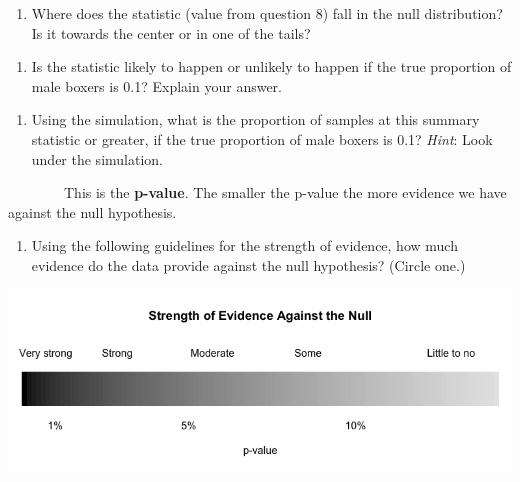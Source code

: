 \documentclass[
]{report}
\providecommand{\tightlist}{%
  \setlength{\itemsep}{0pt}\setlength{\parskip}{0pt}}
\begin{document}
\vspace{1in}

\begin{enumerate}
\def\labelenumi{\arabic{enumi}.}
\setcounter{enumi}{19}
\tightlist
\item
  Where does the statistic (value from question 8) fall in the null distribution? Is it towards the center or in one of the tails?
\end{enumerate}

\vspace{1in}

\begin{enumerate}
\def\labelenumi{\arabic{enumi}.}
\setcounter{enumi}{20}
\tightlist
\item
  Is the statistic likely to happen or unlikely to happen if the true proportion of male boxers is 0.1? Explain your answer.
\end{enumerate}

\vspace{1in}

\begin{enumerate}
\def\labelenumi{\arabic{enumi}.}
\setcounter{enumi}{21}
\tightlist
\item
  Using the simulation, what is the proportion of samples at this summary statistic or greater, if the true proportion of male boxers is 0.1? \emph{Hint}: Look under the simulation.
\end{enumerate}

\vspace{1in}

~~~~~~~~This is the \textbf{p-value}. The smaller the p-value the more evidence we have against the null hypothesis.

\begin{enumerate}
\def\labelenumi{\arabic{enumi}.}
\setcounter{enumi}{22}
\tightlist
\item
  Using the following guidelines for the strength of evidence, how much evidence do the data provide against the null hypothesis? (Circle one.)
\end{enumerate}

\begin{center}\includegraphics[width=0.9\linewidth]{images/soe_gradient_grayscale} \end{center}
\end{document}
